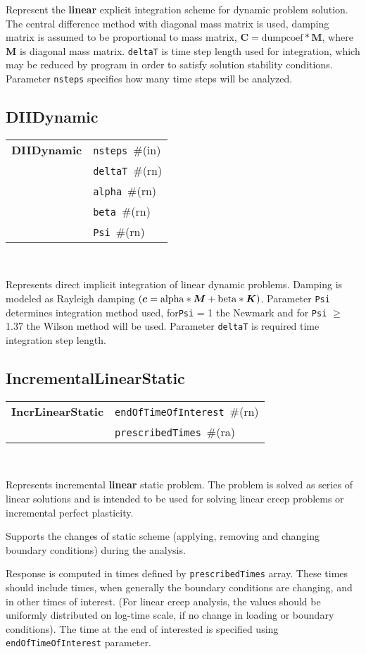 \documentclass[a4paper]{article}
\makeatletter
\newcommand{\mbf}[1]{\boldsymbol{#1}}
\newcommand{\param}[1]{\texttt{#1}} %
\newcommand{\field}[2]{\param{#1}~\#{\tiny(#2)}} %
\newcommand{\entKeywordInst}[1]{\textbf{#1}} %
\newenvironment{record}[1][]{\begin{tabular}{|ll}}{\end{tabular}\\}
\newcommand{\recentry}[2]{{#1}&{#2}\\}
\newcounter{rcc}
\newenvironment{record}[1][\textwidth]{\setcounter{rcc}{0}\begin{tabular*}{#1}{|ll@{\extracolsep{\fill}}r}}{\end{tabular*}\\}
\newcommand{\recentry}[2]{\ifthenelse{\value{rcc}>0}{&$\backslash$ \\}{\setcounter{rcc}{1}}{#1}&{#2}}
\makeatother
\begin{document}
Represent the \textbf{linear} explicit
integration scheme for dynamic problem solution. The central difference method with diagonal mass matrix is used,
damping matrix is assumed to be proportional to mass matrix, $\mbf{C} = \mathrm{dumpcoef} * \mbf{M}$, where
$\mbf{M}$ is diagonal mass matrix. \param{deltaT} is time step length used for
integration, which may be reduced by program in order to satisfy
solution stability conditions. Parameter \param{nsteps} specifies
how many time steps will be analyzed.

\subsection{DIIDynamic}
\label{DIIDynamic}

\begin{record}
  \recentry{\entKeywordInst{DIIDynamic}}{\field{nsteps}{in}}
  \recentry{}{\field{deltaT}{rn}}
  \recentry{}{\field{alpha}{rn}}
  \recentry{}{\field{beta}{rn}}
  \recentry{}{\field{Psi}{rn}}
\end{record}

Represents direct implicit integration of linear dynamic
problems. Damping is modeled as Rayleigh damping $(\mbf{c} =
\rm{alpha}*\mbf{M} + \rm{beta} * \mbf{K})$. Parameter \param{Psi} determines
integration method used, for\param{Psi} = 1 the Newmark and for \param{Psi} $\ge$ 1.37 the Wilson method
will be used. Parameter \param{deltaT} is required time integration
step length.

\subsection{IncrementalLinearStatic}
\label{IncrementalLinearStatic}

\begin{record}
  \recentry{\entKeywordInst{IncrLinearStatic}}{\field{endOfTimeOfInterest}{rn}}
  \recentry{}{\field{pre\-scri\-bed\-Ti\-mes}{ra}}
\end{record}


Represents incremental \textbf{linear} static problem.
The problem is solved as series of linear solutions and is intended to
be used for solving linear creep problems or incremental perfect plasticity.

Supports the changes of static scheme (applying, removing and changing  boundary conditions)
during the analysis.

Response is computed in times defined by \param{pre\-scri\-bed\-Ti\-mes}
array. These times should include times, when generally the  boundary
conditions are changing, and in other times of interest. (For linear creep
analysis, the values should be uniformly distributed on log-time scale, if no change in
loading or boundary conditions). The time at the end of interested is
specified using \param{endOfTimeOfInterest} parameter.
\end{document}
